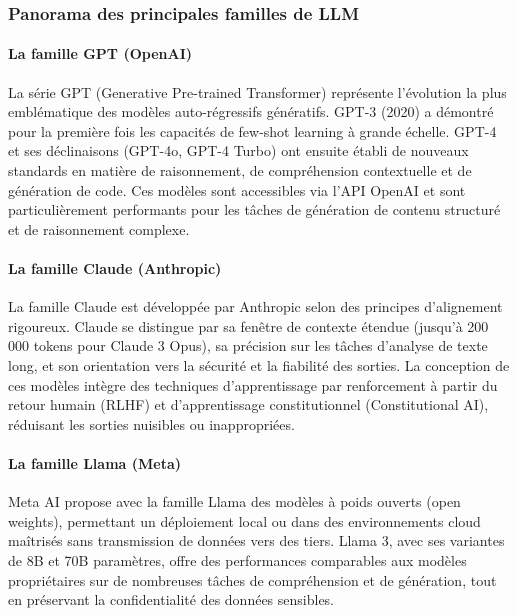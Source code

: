 \subsubsection{Panorama des principales familles de LLM}

\paragraph{La famille GPT (OpenAI)}

La série GPT (Generative Pre-trained Transformer) \cite{logo:openai} représente l'évolution la plus emblématique des modèles auto-régressifs génératifs. GPT-3 (2020) a démontré pour la première fois les capacités de few-shot learning à grande échelle. GPT-4 et ses déclinaisons (GPT-4o, GPT-4 Turbo) ont ensuite établi de nouveaux standards en matière de raisonnement, de compréhension contextuelle et de génération de code. Ces modèles sont accessibles via l'API OpenAI et sont particulièrement performants pour les tâches de génération de contenu structuré et de raisonnement complexe.

\paragraph{La famille Claude (Anthropic)}

La famille Claude \cite{logo:anthropic_api} est développée par Anthropic selon des principes d'alignement rigoureux. Claude se distingue par sa fenêtre de contexte étendue (jusqu'à 200 000 tokens pour Claude 3 Opus), sa précision sur les tâches d'analyse de texte long, et son orientation vers la sécurité et la fiabilité des sorties. La conception de ces modèles intègre des techniques d'apprentissage par renforcement à partir du retour humain (RLHF) et d'apprentissage constitutionnel (Constitutional AI), réduisant les sorties nuisibles ou inappropriées.

\paragraph{La famille Llama (Meta)}

Meta AI propose avec la famille Llama \cite{logo:llama} des modèles à poids ouverts (open weights), permettant un déploiement local ou dans des environnements cloud maîtrisés sans transmission de données vers des tiers. Llama 3, avec ses variantes de 8B et 70B paramètres, offre des performances comparables aux modèles propriétaires sur de nombreuses tâches de compréhension et de génération, tout en préservant la confidentialité des données sensibles.

